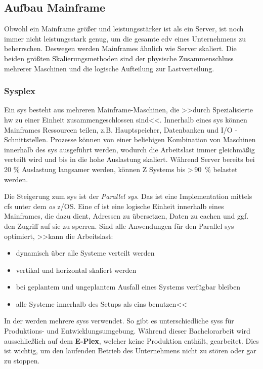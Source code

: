 \subsection{Aufbau Mainframe}

Obwohl ein Mainframe größer und leistungsstärker ist als ein Server, ist noch immer nicht leistungsstark genug, um die gesamte \ac{edv} eines Unternehmens zu beherrschen. Deswegen werden Mainframes ähnlich wie Server skaliert. Die beiden größten Skalierungsmethoden sind der physische Zusammenschluss mehrerer Maschinen und die logische Aufteilung zur Lastverteilung.


\subsubsection{Sysplex}

Ein \ac{sys} besteht aus mehreren Mainframe-Maschinen, die >>durch Spezialisierte \ac{hw} zu einer Einheit zusammengeschlossen sind<<. Innerhalb eines \ac{sys} können Mainframes Ressourcen teilen, z.B. Hauptspeicher, Datenbanken und I/O - Schnittstellen. Prozesse können von einer beliebigen Kombination von Maschinen innerhalb des \ac{sys} ausgeführt werden, wodurch die Arbeitslast immer gleichmäßig verteilt wird und bis in die hohe Auslastung skaliert. Während Server bereits bei 20 \% Auslastung langsamer werden, können Z Systems bis >\,90~\% belastet werden.

Die Steigerung zum \ac{sys} ist der \emph{Parallel \ac{sys}}. Das ist eine Implementation mittels \acp{cf} unter dem \emph{\ac{os}} z/OS. Eine \ac{cf} ist eine logische Einheit innerhalb eines Mainframes, die dazu dient, Adressen zu übersetzen, Daten zu cachen und ggf. den Zugriff auf sie zu sperren. Sind alle Anwendungen für den Parallel \ac{sys} optimiert, >>kann die Arbeitslast:
\begin{itemize}
    \item dynamisch über alle Systeme verteilt werden
    \item vertikal und horizontal skaliert werden
    \item bei geplantem und ungeplantem Ausfall eines Systems verfügbar bleiben
    \item alle Systeme innerhalb des Setups als eins benutzen<<\cite{redbook.1}
\end{itemize}

In der \FirmenName werden mehrere \acp{sys} verwendet. So gibt es unterschiedliche \acp{sys} für Produktions- und Entwicklungsumgebung. Während dieser Bachelorarbeit wird ausschließlich auf dem \textbf{E-Plex}, welcher keine Produktion enthält, gearbeitet. Dies ist wichtig, um den laufenden Betrieb des Unternehmens nicht zu stören oder gar zu stoppen. 



